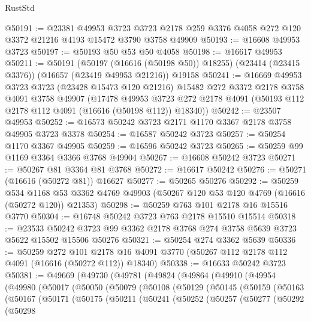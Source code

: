 \begin{lexlean}{RustStd}
\begin{coremodule}
@50191 := @23381
    @49953
    @3723
    @3723
    @2178
    @259
    @3376
    @4058
    @272
    @120
    @3372
    @21216
    @4193
    @15472
    @3790
    @3758
    @49909
@50193 := @16608 @49953 @3723
@50197 := @50193 @50 @53 @50 @4058
@50198 := @16617 @49953
@50211 := @50191
    (@50197 (@16616 (@50198 @50)) @18255)
    (@23414 (@23415 @3376))
    (@16657 (@23419 @49953 @21216))
    @19158
@50241 := @16669
    @49953
    @3723
    @3723
    (@23428 @15473 @120 @21216)
    @15482
    @272
    @3372
    @2178
    @3758
    @4091
    @3758
    @49907
    (@17478
      @49953
      @3723
      @272
      @2178
      @4091
      (@50193 @112 @2178 @112 @4091 (@16616 (@50198 @112)) @18340))
@50242 := @23507 @49953
@50252 := @16573 @50242 @3723 @2171 @1170 @3367 @2178 @3758 @49905 @3723 @3378
@50254 := @16587 @50242 @3723
@50257 := @50254 @1170 @3367 @49905
@50259 := @16596 @50242 @3723
@50265 := @50259 @99 @1169 @3364 @3366 @3768 @49904
@50267 := @16608 @50242 @3723
@50271 := @50267 @81 @3364 @81 @3768
@50272 := @16617 @50242
@50276 := @50271 (@16616 (@50272 @81)) @16627
@50277 := @50265 @50276
@50292 := @50259
    @534
    @1168
    @53
    @3362
    @4769
    @49903
    (@50267 @120 @53 @120 @4769 (@16616 (@50272 @120)) @21353)
@50298 := @50259 @763 @101 @2178 @16 @15516 @3770
@50304 := @16748 @50242 @3723 @763 @2178 @15510 @15514
@50318 := @23533
    @50242
    @3723
    @99
    @3362
    @2178
    @3768
    @274
    @3758
    @5639
    @3723
    @5622
    @15502
    @15506
    @50276
@50321 := @50254 @274 @3362 @5639
@50336 := @50259
    @272
    @101
    @2178
    @16
    @4091
    @3770
    (@50267 @112 @2178 @112 @4091 (@16616 (@50272 @112)) @18340)
@50338 := @16633 @50242 @3723
@50381 := @49669
    (@49730
      (@49781
        (@49824
          (@49864
            (@49910
              (@49954
                (@49980
                  (@50017
                    (@50050
                      (@50079
                        (@50108
                          (@50129
                            (@50145
                              (@50159
                                (@50163
                                  (@50167
                                    (@50171
                                      (@50175
                                        (@50211
                                          (@50241
                                            (@50252
                                              (@50257
                                                (@50277
                                                  (@50292
                                                    (@50298

\end{coremodule}
\end{lexlean}
